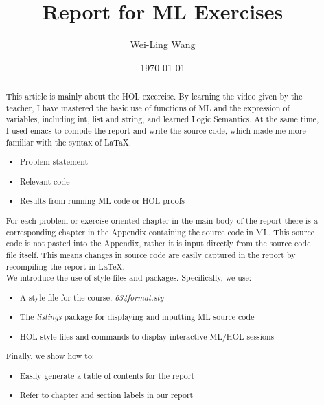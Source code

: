 \documentclass{report}
\title{Report for ML Exercises }
\author{Wei-Ling Wang}
\date{\today}
\begin{document}
\lstset{language=ML}

\maketitle{}

\begin{abstract}

  This article is mainly about the HOL excercise. By learning the video given by the teacher, I have mastered the basic use of functions of ML and the expression of variables, including int, list and string, and learned Logic Semantics. At the same time, I used emacs to compile the report and write the source code, which made me more familiar with the syntax of LaTaX.
  \begin{itemize}
  \item Problem statement
  \item Relevant code
  \item Results from running ML code or HOL proofs
  \end{itemize}

  For each problem or exercise-oriented chapter in the main body of
  the report there is a corresponding chapter in the Appendix containing the
  source code in ML. This source code is not pasted into the Appendix,
  rather it is input directly from the source code file itself. This
  means changes in source code are easily captured in the report by
  recompiling the report in \LaTeX{}. \\


  We introduce the use of style files and packages. Specifically, we
  use:
  \begin{itemize}
  \item A style file for the course, \textit{634format.sty}
  \item The \textit{listings} package for displaying and inputting ML
    source code
  \item HOL style files and commands to display interactive ML/HOL
    sessions
  \end{itemize}
 Finally, we show how to:
  \begin{itemize}
  \item Easily generate a table of contents for the report
  \item Refer to chapter and section labels in our report
  \end{itemize}
\end{abstract}
\end{document}
